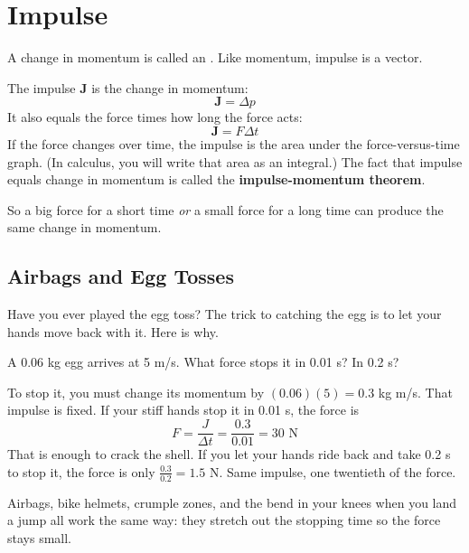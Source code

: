 \section{Impulse}
A change in momentum is called an . Like
momentum, impulse is a vector.

\begin{mdframed}[style=important, frametitle={Formula for Impulse}]
The impulse $\textbf{J}$ is the change in momentum:
\begin{equation}
  \textbf{J} = \Delta p
\end{equation}
It also equals the force times how long the force acts:
\begin{equation}
  \textbf{J} = F\Delta t \label{eq:impulse-momentum1}
\end{equation}
If the force changes over time, the impulse is the area under the
force-versus-time graph. (In calculus, you will write that area as an
integral.) The fact that impulse equals change in momentum is called the
\textbf{impulse-momentum theorem}.
\end{mdframed}
So a big force for a short time \textit{or} a small force for a long time
can produce the same change in momentum.

\subsection{Airbags and Egg Tosses}
Have you ever played the egg toss? The trick to catching the egg is to let
your hands move back with it. Here is why.

\begin{Worked}
\begin{Problem}
A 0.06 kg egg arrives at 5 m/s. What force stops it in 0.01 s? In 0.2 s?
\end{Problem}
\begin{Solution}
To stop it, you
must change its momentum by $(0.06)(5) = 0.3$ kg m/s. That impulse is fixed.
If your stiff hands stop it in 0.01 s, the force is
$$F = \frac{J}{\Delta t} = \frac{0.3}{0.01} = 30 \text{ N}$$
That is enough to crack the shell. If you let your hands ride back and take
0.2 s to stop it, the force is only $\frac{0.3}{0.2} = 1.5$ N. Same
impulse, one twentieth of the force.
\end{Solution}
\end{Worked}

Airbags, bike helmets, crumple zones, and the bend in your knees when you
land a jump all work the same way: they stretch out the stopping time so
the force stays small.

